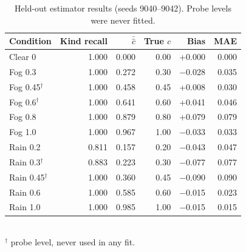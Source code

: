 \documentclass[conference]{IEEEtran}
\begin{document}
\begin{table}[t]
\centering\caption{Held-out estimator results (seeds 9040--9042). Probe levels were never fitted.}\label{tab:est}
\footnotesize
\begin{tabular}{lrrrrr}
\toprule
Condition & Kind recall & $\bar{\hat c}$ & True $c$ & Bias & MAE \\
\midrule
Clear 0 & 1.000 & 0.000 & 0.00 & +0.000 & 0.000\\
Fog 0.3 & 1.000 & 0.272 & 0.30 & $-$0.028 & 0.035\\
Fog 0.45$^\dagger$ & 1.000 & 0.458 & 0.45 & +0.008 & 0.030\\
Fog 0.6$^\dagger$ & 1.000 & 0.641 & 0.60 & +0.041 & 0.046\\
Fog 0.8 & 1.000 & 0.879 & 0.80 & +0.079 & 0.079\\
Fog 1.0 & 1.000 & 0.967 & 1.00 & $-$0.033 & 0.033\\
Rain 0.2 & 0.811 & 0.157 & 0.20 & $-$0.043 & 0.047\\
Rain 0.3$^\dagger$ & 0.883 & 0.223 & 0.30 & $-$0.077 & 0.077\\
Rain 0.45$^\dagger$ & 1.000 & 0.360 & 0.45 & $-$0.090 & 0.090\\
Rain 0.6 & 1.000 & 0.585 & 0.60 & $-$0.015 & 0.023\\
Rain 1.0 & 1.000 & 0.985 & 1.00 & $-$0.015 & 0.015\\
\bottomrule
\end{tabular}
\\[1mm]\footnotesize $^\dagger$ probe level, never used in any fit.
\end{table}
\end{document}
